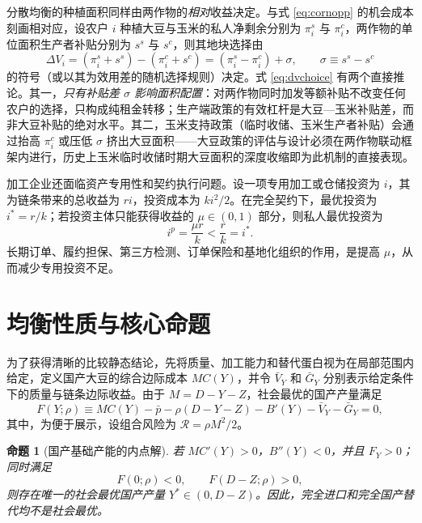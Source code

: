 \documentclass[UTF8,zihao=-4,fontset=fandol]{ctexart}
\numberwithin{equation}{section}
\newtheorem{proposition}{命题}
\theoremstyle{definition}
\theoremstyle{remark}
\begin{document}
分散均衡的种植面积同样由两作物的\emph{相对}收益决定。与式 \eqref{eq:cornopp} 的机会成本刻画相对应，设农户 $i$ 种植大豆与玉米的私人净剩余分别为 $\pi_i^s$ 与 $\pi_i^c$，两作物的单位面积生产者补贴分别为 $s^s$ 与 $s^c$，则其地块选择由
\begin{equation}
 \Delta V_i=\left(\pi_i^s+s^s\right)-\left(\pi_i^c+s^c\right)
 =\left(\pi_i^s-\pi_i^c\right)+\sigma,
 \qquad \sigma\equiv s^s-s^c
 \label{eq:dvchoice}
\end{equation}
的符号（或以其为效用差的随机选择规则）决定。式 \eqref{eq:dvchoice} 有两个直接推论。其一，\emph{只有补贴差 $\sigma$ 影响面积配置}：对两作物同时加发等额补贴不改变任何农户的选择，只构成纯租金转移；生产端政策的有效杠杆是大豆—玉米补贴差，而非大豆补贴的绝对水平。其二，玉米支持政策（临时收储、玉米生产者补贴）会通过抬高 $\pi_i^c$ 或压低 $\sigma$ 挤出大豆面积——大豆政策的评估与设计必须在两作物联动框架内进行，历史上玉米临时收储时期大豆面积的深度收缩即为此机制的直接表现。

加工企业还面临资产专用性和契约执行问题。设一项专用加工或仓储投资为 $i$，其为链条带来的总收益为 $ri$，投资成本为 $ki^2/2$。在完全契约下，最优投资为 $i^*=r/k$；若投资主体只能获得收益的 $\mu\in(0,1)$ 部分，则私人最优投资为
\begin{equation}
 i^p=\frac{\mu r}{k}<\frac{r}{k}=i^*.
 \label{eq:asset}
\end{equation}
长期订单、履约担保、第三方检测、订单保险和基地化组织的作用，是提高 $\mu$，从而减少专用投资不足。

\section{均衡性质与核心命题}

为了获得清晰的比较静态结论，先将质量、加工能力和替代蛋白视为在局部范围内给定，定义国产大豆的综合边际成本 $MC(Y)$，并令 $\bar V_Y$ 和 $\bar G_Y$ 分别表示给定条件下的质量与链条边际收益。由于 $M=D-Y-Z$，社会最优的国产产量满足
\begin{equation}
 F(Y;\rho)\equiv MC(Y)-\bar p-\rho(D-Y-Z)-B'(Y)-\bar V_Y-\bar G_Y=0,
 \label{eq:reducedFOC}
\end{equation}
其中，为便于展示，设组合风险为 $\mathcal{R}=\rho M^2/2$。

\begin{proposition}[国产基础产能的内点解]
若 $MC'(Y)>0$，$B''(Y)<0$，并且 $F_Y>0$；同时满足
\begin{equation}
 F(0;\rho)<0,\qquad F(D-Z;\rho)>0,
 \label{eq:interiorcondition}
\end{equation}
则存在唯一的社会最优国产产量 $Y^*\in(0,D-Z)$。因此，完全进口和完全国产替代均不是社会最优。
\end{proposition}
\end{document}
